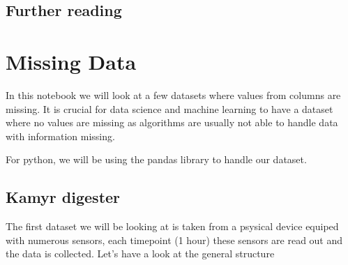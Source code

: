 \documentclass[letterpaper,10pt,english]{jupyterBook}
\begin{document}
\section{Further reading}
\label{\detokenize{c2_data_preparation/introduction:further-reading}}
\sphinxAtStartPar
{}


\chapter{Missing Data}
\label{\detokenize{c2_data_preparation/missing_data:missing-data}}\label{\detokenize{c2_data_preparation/missing_data::doc}}
\sphinxAtStartPar
In this notebook we will look at a few datasets where values from columns are missing.
It is crucial for data science and machine learning to have a dataset where no values are missing as algorithms are usually not able to handle data with information missing.

\sphinxAtStartPar
For python, we will be using the pandas library to handle our dataset.

\begin{sphinxVerbatim}[commandchars=\\\{\}]
   
\end{sphinxVerbatim}


\section{Kamyr digester}
\label{\detokenize{c2_data_preparation/missing_data:kamyr-digester}}
\sphinxAtStartPar
The first dataset we will be looking at is taken from a psysical device equiped with numerous sensors, each timepoint (1 hour) these sensors are read out and the data is collected. Let’s have a look at the general structure

\begin{sphinxVerbatim}[commandchars=\\\{\}]
  
\end{sphinxVerbatim}
\end{document}
